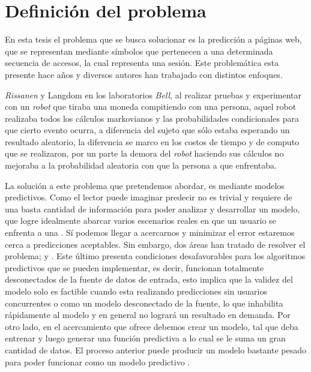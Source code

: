 
\section{Definición del problema}



En esta tesis el problema que se busca solucionar es la predicción a páginas web, que se representan mediante símbolos que pertenecen a una determinada secuencia de accesos, la cual representa una sesión. Este problemática esta presente hace años y diversos autores han trabajado con distintos enfoques. 

\emph{Rissanen}\cite{Rissanen1983} y Langdom\cite{Langdon1983} en los laboratorios \emph{Bell}, al realizar pruebas y experimentar con un \emph{robot} que tiraba una moneda compitiendo con una persona, aquel robot realizaba todos los cálculos {markovianos} y las probabilidades condicionales para que cierto evento ocurra, a diferencia del sujeto que sólo estaba esperando un resultado aleatorio, la diferencia se marco en los costos de tiempo y de computo que se realizaron, por un parte la demora del \emph{robot} haciendo sus cálculos no mejoraba a la probabilidad aleatoria con que la persona a que enfrentaba. 


La solución a este problema que pretendemos abordar, es mediante modelos predictivos. Como el lector puede imaginar predecir no es trivial y requiere de una basta cantidad de  información para poder analizar y desarrollar un modelo, que logre idealmente abarcar varios escenarios reales en que un usuario se enfrenta a una \web. Sí podemos llegar a acercarnos y minimizar el error estaremos cerca a predicciones aceptables. Sin embargo, dos áreas han tratado de resolver el problema; \machinelearning y \datacompression. Este último presenta condiciones desafavorables para los algoritmos predictivos que se pueden implementar, es decir, funcionan totalmente desconectados de la fuente de datos de entrada, esto implica que la validez del modelo solo es factible cuando esta realizando predicciones sin usuarios concurrentes o como un modelo desconectado de la fuente, lo que inhabilita rápidamente al modelo y en general no logrará un resultado en demanda. Por otro lado, en el acercamiento que ofrece \machinelearning debemos crear un modelo, tal que  deba entrenar y luego generar una función predictiva a lo cual se le suma un gran cantidad de datos. El proceso anterior puede producir un modelo bastante pesado para poder funcionar como un modelo predictivo \online. 

